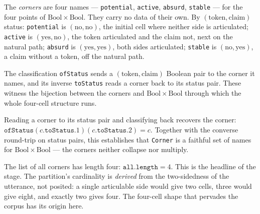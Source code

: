 \begin{definition}\label{def:corner}\leanok{}
The \emph{corners} are four names --- \texttt{potential}, \texttt{active}, \texttt{absurd}, \texttt{stable} --- for the four points of $\mathrm{Bool}\times\mathrm{Bool}$. They carry no data of their own. By $(\text{token},\text{claim})$ status: \texttt{potential} is $(\text{no},\text{no})$, the initial cell where neither side is articulated; \texttt{active} is $(\text{yes},\text{no})$, the token articulated and the claim not, next on the natural path; \texttt{absurd} is $(\text{yes},\text{yes})$, both sides articulated; \texttt{stable} is $(\text{no},\text{yes})$, a claim without a token, off the natural path.
\end{definition}

\begin{definition}\leanok{}
The classification \texttt{ofStatus} sends a $(\text{token},\text{claim})$ Boolean pair to the corner it names, and its inverse \texttt{toStatus} reads a corner back to its status pair. These witness the bijection between the corners and $\mathrm{Bool}\times\mathrm{Bool}$ through which the whole four-cell structure runs.
\end{definition}

\begin{lemma}\label{def:corner-iso}\leanok{}
Reading a corner to its status pair and classifying back recovers the corner: $\texttt{ofStatus}(c.\texttt{toStatus}.1)(c.\texttt{toStatus}.2) = c$. Together with the converse round-trip on status pairs, this establishes that \texttt{Corner} is a faithful set of names for $\mathrm{Bool}\times\mathrm{Bool}$ --- the corners neither collapse nor multiply.
\end{lemma}

\begin{theorem}\label{def:corner-card}\leanok{}
The list of all corners has length four: $\texttt{all.length} = 4$. This is the headline of the stage. The partition's cardinality is \emph{derived} from the two-sidedness of the utterance, not posited: a single articulable side would give two cells, three would give eight, and exactly two gives four. The four-cell shape that pervades the corpus has its origin here.
\end{theorem}

